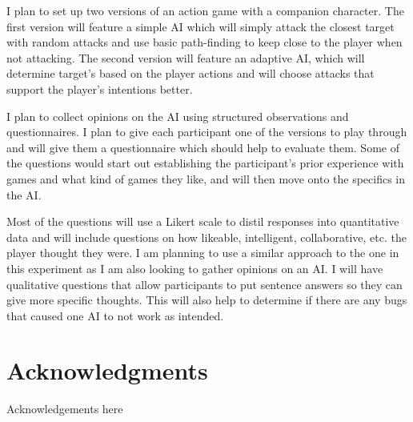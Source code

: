 \documentclass{IEEEtran}
\begin{document}
I plan to set up two versions of an action game with a companion character. The first version will feature a simple AI which will simply attack the closest target with random attacks and use basic path-finding to keep close to the player when not attacking. The second version will feature an adaptive AI, which will determine target's based on the player actions and will choose attacks that support the player's intentions better.

I plan to collect opinions on the AI using structured observations and questionnaires. I plan to give each participant one of the versions to play through and will give them a questionnaire which should help to evaluate them. Some of the questions would start out establishing the participant's prior experience with games and what kind of games they like, and will then move onto the specifics in the AI.

Most of the questions will use a Likert scale to distil responses into quantitative data and will include questions on how likeable, intelligent, collaborative, etc. the player thought they were. I am planning to use a similar approach to the one in this experiment \cite{SocialPerceptions2020} as I am also looking to gather opinions on an AI. I will have qualitative questions that allow participants to put sentence answers so they can give more specific thoughts. This will also help to determine if there are any bugs that caused one AI to not work as intended.
 
\section*{Acknowledgments}

Acknowledgements here


 
\end{document}
